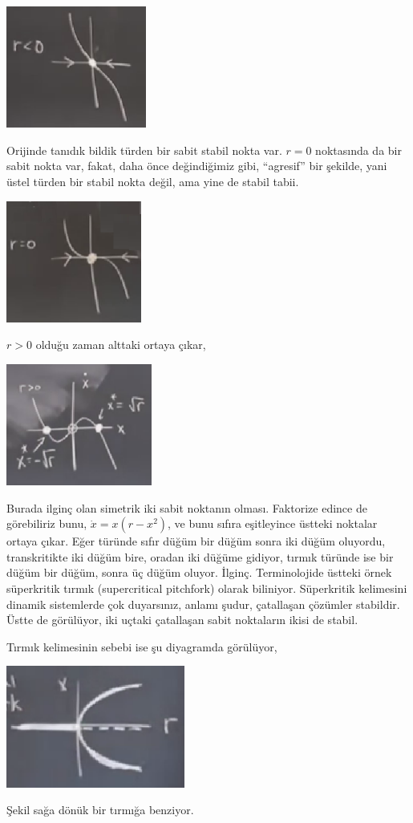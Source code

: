 \documentclass[12pt,fleqn]{article}\usepackage{../../common}
\begin{document}
\includegraphics[height=4cm]{02_19.png}

Orijinde tanıdık bildik türden bir sabit stabil nokta var. $r=0$ noktasında da
bir sabit nokta var, fakat, daha önce değindiğimiz gibi, ``agresif'' bir
şekilde, yani üstel türden bir stabil nokta değil, ama yine de stabil tabii. 

\includegraphics[height=4cm]{02_20.png}

$r>0$ olduğu zaman alttaki ortaya çıkar, 

\includegraphics[height=4cm]{02_21.png}

Burada ilginç olan simetrik iki sabit noktanın olması. Faktorize edince de
görebiliriz bunu, $\dot{x}=x(r-x^2)$, ve bunu sıfıra eşitleyince üstteki
noktalar ortaya çıkar. Eğer türünde sıfır düğüm bir düğüm sonra iki düğüm
oluyordu, transkritikte iki düğüm bire, oradan iki düğüme gidiyor, tırmık
türünde ise bir düğüm bir düğüm, sonra üç düğüm oluyor. İlginç. Terminolojide
üstteki örnek süperkritik tırmık (supercritical pitchfork) olarak
biliniyor. Süperkritik kelimesini dinamik sistemlerde çok duyarsınız, anlamı
şudur, çatallaşan çözümler stabildir. Üstte de görülüyor, iki uçtaki çatallaşan
sabit noktaların ikisi de stabil. 

Tırmık kelimesinin sebebi ise şu diyagramda görülüyor,

\includegraphics[height=4cm]{02_22.png}

Şekil sağa dönük bir tırmığa benziyor. 
\end{document}
